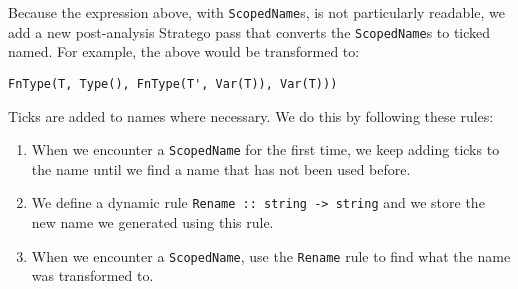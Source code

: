 Because the expression above, with \verb|ScopedName|s, is not particularly readable, we add a new post-analysis Stratego pass that converts the \verb|ScopedName|s to ticked named. For example, the above would be transformed to:

\begin{lstlisting}
FnType(T, Type(), FnType(T', Var(T)), Var(T)))
\end{lstlisting}
Ticks are added to names where necessary. We do this by following these rules:

\begin{enumerate}
	\item When we encounter a \verb|ScopedName| for the first time, we keep adding ticks to the name until we find a name that has not been used before. 
	\item We define a dynamic rule \verb|Rename :: string -> string| and we store the new name we generated using this rule.
	\item When we encounter a \verb|ScopedName|, use the \verb|Rename| rule to find what the name was transformed to.
\end{enumerate}

